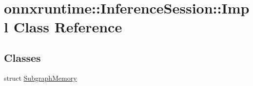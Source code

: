\hypertarget{classonnxruntime_1_1InferenceSession_1_1Impl}{}\section{onnxruntime\+:\+:Inference\+Session\+:\+:Impl Class Reference}
\label{classonnxruntime_1_1InferenceSession_1_1Impl}
\subsection*{Classes}
\begin{DoxyCompactItemize}
\item 
struct \mbox{\hyperlink{structonnxruntime_1_1InferenceSession_1_1Impl_1_1SubgraphMemory}{Subgraph\+Memory}}
\end{DoxyCompactItemize}
